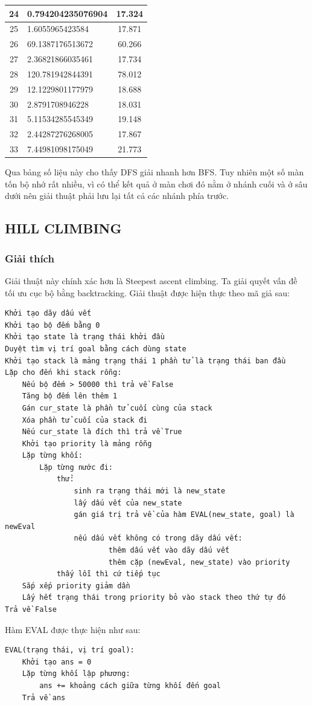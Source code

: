 \documentclass[a4paper, 11pt]{article}
\begin{document}
\begin{center}
\begin{tabular}{|c|l|c|}
		24       & 0.794204235076904 & 17.324       \\ \hline
		25       & 1.6055965423584   & 17.871       \\ \hline
		26       & 69.1387176513672  & 60.266       \\ \hline
		27       & 2.36821866035461  & 17.734       \\ \hline
		28       & 120.781942844391  & 78.012       \\ \hline
		29       & 12.1229801177979  & 18.688       \\ \hline
		30       & 2.8791708946228   & 18.031       \\ \hline
		31       & 5.11534285545349  & 19.148       \\ \hline
		32       & 2.44287276268005  & 17.867       \\ \hline
		33       & 7.44981098175049  & 21.773       \\ \hline
	\end{tabular}
\end{center}
Qua bảng số liệu này cho thấy DFS giải nhanh hơn BFS. Tuy nhiên một số màn tốn bộ nhớ rất nhiều, vì có thể 
kết quả ở màn chơi đó nằm ở nhánh cuối và ở sâu dưới nên giải thuật phải lưu lại tất cả các nhánh phía trước.
\subsection{HILL CLIMBING}
\subsubsection{Giải thích}
Giải thuật này chính xác hơn là Steepest ascent climbing. Ta giải quyết vấn đề tối ưu cục bộ bằng
backtracking. Giải thuật được hiện thực theo mã giả sau:
\begin{verbatim}
Khởi tạo dãy dấu vết
Khởi tạo bộ đếm bằng 0
Khởi tạo state là trạng thái khởi đầu
Duyệt tìm vị trí goal bằng cách dùng state
Khởi tạo stack là mảng trạng thái 1 phần tử là trạng thái ban đầu
Lặp cho đến khi stack rỗng:
    Nếu bộ đếm > 50000 thì trả về False
    Tăng bộ đếm lên thêm 1
    Gán cur_state là phần tử cuối cùng của stack
    Xóa phần tử cuối của stack đi
    Nếu cur_state là đích thì trả về True
    Khởi tạo priority là mảng rỗng
    Lặp từng khối:
        Lặp từng nước đi:
            thử:
                sinh ra trạng thái mới là new_state
                lấy dấu vết của new_state
                gán giá trị trả về của hàm EVAL(new_state, goal) là newEval 
                nếu dấu vết không có trong dãy dấu vết:
                        thêm dấu vết vào dãy dấu vết
                        thêm cặp (newEval, new_state) vào priority
            thấy lỗi thì cứ tiếp tục
    Sắp xếp priority giảm dần
    Lấy hết trạng thái trong priority bỏ vào stack theo thứ tự đó
Trả về False
\end{verbatim}
Hàm EVAL được thực hiện như sau:
\begin{verbatim}
EVAL(trạng thái, vị trí goal):
    Khởi tạo ans = 0
    Lặp từng khối lập phương:
        ans += khoảng cách giữa từng khối đến goal
    Trả về ans
\end{verbatim}
\end{document}
